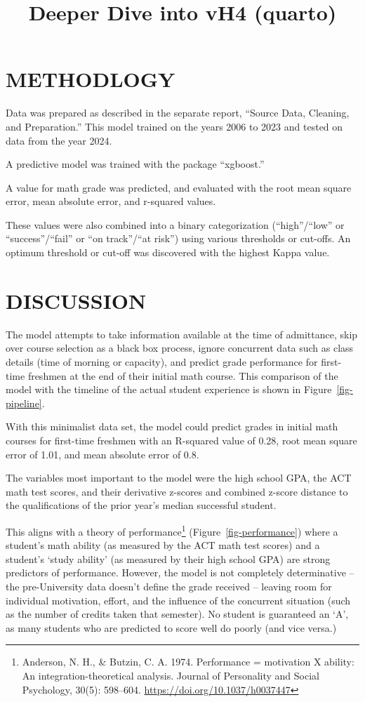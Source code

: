 \documentclass[
  letterpaper,
  DIV=11,
  numbers=noendperiod]{scrartcl}
\title{Deeper Dive into vH4 (quarto)}
\author{}
\date{}
\begin{document}
\maketitle


\section{METHODLOGY}\label{methodlogy}

Data was prepared as described in the separate report, ``Source Data,
Cleaning, and Preparation.'' This model trained on the years 2006 to
2023 and tested on data from the year 2024.

A predictive model was trained with the package ``xgboost.''

A value for math grade was predicted, and evaluated with the root mean
square error, mean absolute error, and r-squared values.

These values were also combined into a binary categorization
(``high''/``low'' or ``success''/``fail'' or ``on track''/``at risk'')
using various thresholds or cut-offs. An optimum threshold or cut-off
was discovered with the highest Kappa value.

\section{DISCUSSION}\label{discussion}

The model attempts to take information available at the time of
admittance, skip over course selection as a black box process, ignore
concurrent data such as class details (time of morning or capacity), and
predict grade performance for first-time freshmen at the end of their
initial math course. This comparison of the model with the timeline of
the actual student experience is shown in Figure~\ref{fig-pipeline}.

With this minimalist data set, the model could predict grades in initial
math courses for first-time freshmen with an R-squared value of 0.28,
root mean square error of 1.01, and mean absolute error of 0.8.

The variables most important to the model were the high school GPA, the
ACT math test scores, and their derivative z-scores and combined z-score
distance to the qualifications of the prior year's median successful
student.

This aligns with a theory of performance\footnote{Anderson, N. H., \&
  Butzin, C. A. 1974. Performance = motivation X ability: An
  integration-theoretical analysis. Journal of Personality and Social
  Psychology, 30(5): 598--604. \url{https://doi.org/10.1037/h0037447}}
(Figure~\ref{fig-performance}) where a student's math ability (as
measured by the ACT math test scores) and a student's `study ability'
(as measured by their high school GPA) are strong predictors of
performance. However, the model is not completely determinative -- the
pre-University data doesn't define the grade received -- leaving room
for individual motivation, effort, and the influence of the concurrent
situation (such as the number of credits taken that semester). No
student is guaranteed an `A', as many students who are predicted to
score well do poorly (and vice versa.)
\end{document}
